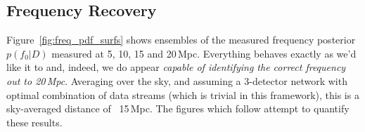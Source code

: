\documentclass[showpacs, superscriptaddress, showpacs, letterpaper, showkeys,
preprintnumbers, altaffilletter, amssymb, amsmath, amsfonts, prd,
onecolumn, floatfix, nofootinbib]{revtex4-1}
\begin{document}
\subsection{Frequency Recovery}
Figure~\ref{fig:freq_pdf_surfs} shows ensembles of the measured frequency
posterior $p(f_0|D)$ measured at 5, 10, 15 and 20\,Mpc.  Everything behaves
exactly as we'd like it to and, indeed, we do appear \emph{capable of
identifying the correct frequency out to 20\,Mpc}.  Averaging over the sky, and
assuming a 3-detector network with optimal combination of data streams (which is
trivial in this framework), this is a sky-averaged distance of ~15\,Mpc.  The
figures which follow attempt to quantify these results.

\begin{figure}
\begin{subfigure}{.4\textwidth}
{\label{fig:freqpdfs5Mpc}}
\end{subfigure}
%
\begin{subfigure}{.4\textwidth}
{\label{fig:freqpdfs10Mpc}} 

\end{subfigure}
\end{figure}
\end{document}
